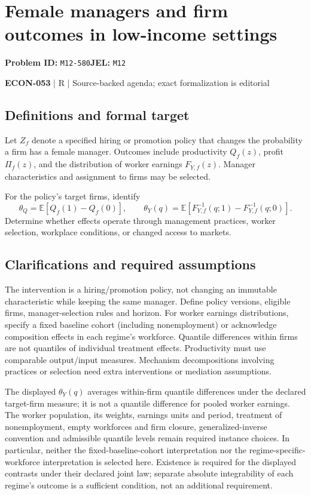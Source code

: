 \documentclass[11pt,a4paper]{article}
\begin{document}
\section*{Female managers and firm outcomes in low-income settings}
\textbf{Problem ID:} \texttt{M12-580}\quad \textbf{JEL:} \texttt{M12}\par
\label{problem:OP-0623}


\label{audited:ECON-053}

{\sffamily\small\color{muted}\textbf{ECON-053} | R | Source-backed agenda; exact formalization is editorial\par}

\subsection*{Definitions and formal target}

Let $Z_f$ denote a specified hiring or promotion policy that changes the probability a firm has a female manager. Outcomes include productivity $Q_f(z)$, profit $\Pi_f(z)$, and the distribution of worker earnings $F_{Y,f}(z)$. Manager characteristics and assignment to firms may be selected.

For the policy's target firms, identify
\[
 \theta_Q=\mathbb E[Q_f(1)-Q_f(0)],\qquad
 \theta_Y(q)=\mathbb E[F^{-1}_{Y,f}(q;1)-F^{-1}_{Y,f}(q;0)].
\]
Determine whether effects operate through management practices, worker selection, workplace conditions, or changed access to markets.

\subsection*{Clarifications and required assumptions}

The intervention is a hiring/promotion policy, not changing an immutable characteristic while keeping the same manager. Define policy versions, eligible firms, manager-selection rules and horizon. For worker earnings distributions, specify a fixed baseline cohort (including nonemployment) or acknowledge composition effects in each regime's workforce. Quantile differences within firms are not quantiles of individual treatment effects. Productivity must use comparable output/input measures. Mechanism decompositions involving practices or selection need extra interventions or mediation assumptions.

The displayed $\theta_Y(q)$ averages within-firm quantile differences under the declared target-firm measure; it is not a quantile difference for pooled worker earnings. The worker population, its weights, earnings units and period, treatment of nonemployment, empty workforces and firm closure, generalized-inverse convention and admissible quantile levels remain required instance choices. In particular, neither the fixed-baseline-cohort interpretation nor the regime-specific-workforce interpretation is selected here. Existence is required for the displayed contrasts under their declared joint law; separate absolute integrability of each regime's outcome is a sufficient condition, not an additional requirement.
\end{document}
